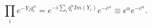 \begin{equation}
\label{eq:SLAG3}
\prod_i e^{-Y_i q^\alpha_i}=e^{-i\sum_i q^\alpha_i Im(Y_i)}e^{-c^\alpha}
\equiv\epsilon^\alpha e^{-c^\alpha}.
\end{equation}

